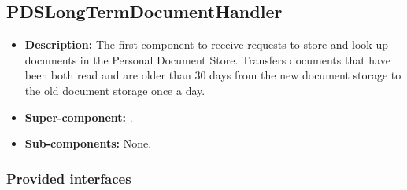 \subsection{PDSLongTermDocumentHandler}
\begin{itemize}
    \item \textbf{Description:} The first component to receive requests to store and look up documents in the Personal Document Store. Transfers documents that have been both read and are older than 30 days from the new document storage to the old document storage once a day.
    \item \textbf{Super-component:} .
    \item \textbf{Sub-components:} None.
\end{itemize}

\subsubsection*{Provided interfaces}
